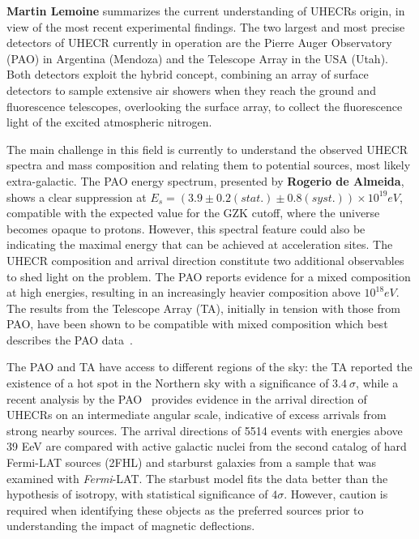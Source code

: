 \documentclass{PoS}
\begin{document}
{\bf Martin Lemoine} summarizes the current understanding of UHECRs origin, in view of the most recent experimental findings. The two largest and most precise detectors of UHECR currently in operation are the
Pierre Auger Observatory (PAO) in Argentina (Mendoza) and the Telescope Array in the
USA (Utah). Both detectors exploit the hybrid concept, combining an array of
surface detectors to sample extensive air showers when they reach the ground and
fluorescence telescopes, overlooking the surface array, to collect the fluorescence light of the excited atmospheric nitrogen. 

The main challenge in this field is currently to understand the observed UHECR spectra and mass composition and relating them to potential sources, most likely extra-galactic. 
The PAO energy spectrum, presented by {\bf Rogerio de Almeida}, shows a clear suppression at $E_{s} = (3.9 \pm 0.2(stat.) \pm
0.8(syst.)) \times 10^{19} eV$, compatible with the expected value for the GZK cutoff, where the universe becomes opaque to protons. However, this spectral feature could also be indicating the maximal energy that can be achieved at acceleration sites. 
The UHECR composition and arrival direction constitute two additional observables to shed light on the problem. The PAO reports evidence for a mixed composition at high energies, resulting in an increasingly heavier composition above $10^{18} eV$. The results from the Telescope Array (TA), initially in tension with those from PAO, have been shown to be compatible with mixed composition which best describes the PAO data~\cite{vitor}. 

The PAO and TA have access to different regions of the sky: the TA reported the existence of a hot spot in the Northern sky with a significance of $3.4~\sigma$, while a recent analysis by the PAO~\cite{Aab:2018chp} provides evidence in the arrival direction of
UHECRs on an intermediate angular scale, indicative of excess arrivals from strong nearby sources. 
The arrival directions of 5514 events with energies above 39 EeV are compared with active galactic nuclei from the second catalog of hard Fermi-LAT sources (2FHL) and starburst galaxies from a sample that was examined with \textit{Fermi}-LAT. The starbust model fits the data better than the hypothesis of isotropy, with statistical significance of $4\sigma$. However, caution is required when identifying these objects as the preferred 
sources prior to understanding the impact of magnetic deflections. 
\end{document}
